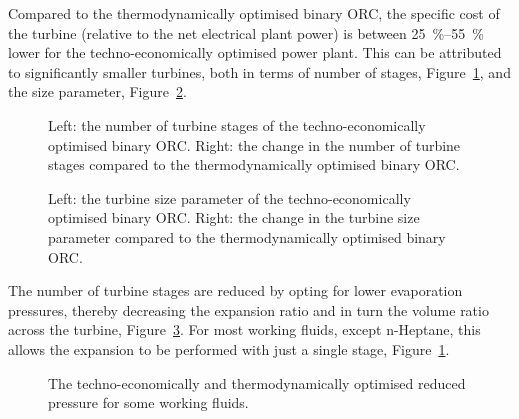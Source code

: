     Compared to the thermodynamically optimised binary \ac{ORC}, the specific cost of the turbine (relative to the net electrical plant power) is between \qtyrange{25}{55}{\percent} lower for the techno-economically optimised power plant. This can be attributed to significantly smaller turbines, both in terms of number of stages, Figure~\ref{fig:prosim_purewater_ORC_techno_opt_stages}, and the size parameter, Figure~\ref{fig:prosim_purewater_ORC_techno_opt_sp}. 

    \begin{figure}[H]
        \centering
        
        \caption[The number of turbine stages of the techno-economically optimised binary \ac{ORC} geothermal power plant.]{Left: the number of turbine stages of the techno-economically optimised binary \ac{ORC}. Right: the change in the number of turbine stages compared to the thermodynamically optimised binary \ac{ORC}.}
        \label{fig:prosim_purewater_ORC_techno_opt_stages}
    \end{figure}

    \begin{figure}[H]
        \centering
        
        \caption[The turbine size parameter of the techno-economically optimised binary \ac{ORC}.]{Left: the turbine size parameter of the techno-economically optimised binary \ac{ORC}. Right: the change in the turbine size parameter compared to the thermodynamically optimised binary \ac{ORC}.}
        \label{fig:prosim_purewater_ORC_techno_opt_sp}
    \end{figure}

    The number of turbine stages are reduced by opting for lower evaporation pressures, thereby decreasing the expansion ratio and in turn the volume ratio across the turbine, Figure~\ref{fig:prosim_purewater_techno_op_Pmax}. For most working fluids, except n-Heptane, this allows the expansion to be performed with just a single stage, Figure~\ref{fig:prosim_purewater_ORC_techno_opt_stages}. 

    \begin{figure}[H]
        \centering
        
        \caption{The techno-economically and thermodynamically optimised reduced pressure for some working fluids.}
        \label{fig:prosim_purewater_techno_op_Pmax}
    \end{figure}

